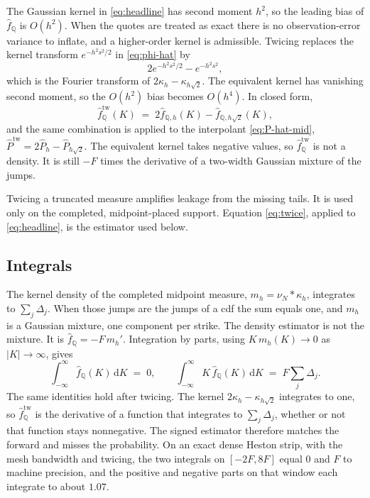 \documentclass[preprint,12pt,authoryear,times]{elsarticle}
\newcommand{\Q}{\mathbb{Q}}
\begin{document}
The Gaussian kernel in \eqref{eq:headline} has second moment \(h^2\), so the leading bias of \(\hat f_{\Q}\) is \(O(h^2)\). When the quotes are treated as exact there is no observation-error variance to inflate, and a higher-order kernel is admissible. Twicing \citep{schucanysommers1977} replaces the kernel transform \(e^{-h^2 s^2/2}\) in \eqref{eq:phi-hat} by
\begin{equation}
\label{eq:phi-twice}
2e^{-h^2 s^2/2}-e^{-h^2 s^2},
\end{equation}
which is the Fourier transform of \(2\kappa_h-\kappa_{h\sqrt{2}}\). The equivalent kernel has vanishing second moment, so the \(O(h^2)\) bias becomes \(O(h^4)\). In closed form,
\begin{equation}
\label{eq:twice}
\hat f_{\Q}^{\mathrm{tw}}(K)
\;=\;
2\hat f_{\Q,h}(K)-\hat f_{\Q,h\sqrt{2}}(K),
\end{equation}
and the same combination is applied to the interpolant \eqref{eq:P-hat-mid}, \(\hat P^{\mathrm{tw}}=2\hat P_h-\hat P_{h\sqrt{2}}\). The equivalent kernel takes negative values, so \(\hat f_{\Q}^{\mathrm{tw}}\) is not a density. It is still \(-F\) times the derivative of a two-width Gaussian mixture of the jumps.

Twicing a truncated measure amplifies leakage from the missing tails. It is used only on the completed, midpoint-placed support. Equation \eqref{eq:twice}, applied to \eqref{eq:headline}, is the estimator used below.

\subsection{Integrals}
\label{sec:mass}

The kernel density of the completed midpoint measure, \(m_h=\nu_N\ast\kappa_h\), integrates to \(\sum_j\Delta_j\). When those jumps are the jumps of a cdf the sum equals one, and \(m_h\) is a Gaussian mixture, one component per strike. The density estimator is not the mixture. It is \(\hat f_{\Q}=-F\,m_h'\). Integration by parts, using \(K\,m_h(K)\to 0\) as \(|K|\to\infty\), gives
\begin{equation}
\label{eq:moments}
\int_{-\infty}^{\infty}\hat f_{\Q}(K)\,\mathrm{d}K
\;=\;
0,
\qquad
\int_{-\infty}^{\infty}K\,\hat f_{\Q}(K)\,\mathrm{d}K
\;=\;
F\sum_j\Delta_j.
\end{equation}
The same identities hold after twicing. The kernel \(2\kappa_h-\kappa_{h\sqrt{2}}\) integrates to one, so \(\hat f_{\Q}^{\mathrm{tw}}\) is the derivative of a function that integrates to \(\sum_j\Delta_j\), whether or not that function stays nonnegative. The signed estimator therefore matches the forward and misses the probability. On an exact dense Heston strip, with the mesh bandwidth and twicing, the two integrals on \([-2F,8F]\) equal \(0\) and \(F\) to machine precision, and the positive and negative parts on that window each integrate to about \(1.07\).
\end{document}
